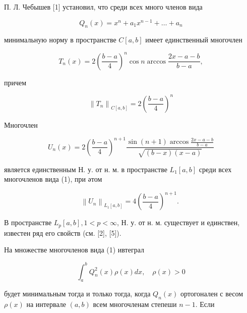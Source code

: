 \documentclass[10pt]{article}
\begin{document}
П. Л. Чебышев [1] установил, что среди всех много членов вида



\[

Q_{n}(x)=x^{n}+a_{1} x^{n-1}+\ldots+a_{n}

\]



минимальную норму в пространстве $C[a, b]$ имеет единственный многочлен



\[

T_{n}(x)=2\left(\frac{b-a}{4}\right)^{n} \cos n \arccos \frac{2 x-a-b}{b-a},

\]



причем



\[

\left\|T_{n}\right\|_{C[a, b]}=2\left(\frac{b-a}{4}\right)^{n}

\]



Многочлен



\[

U_{n}(x)=2\left(\frac{b-a}{4}\right)^{n+1} \frac{\sin (n+1) \arccos \frac{2 x-a-b}{b-a}}{\sqrt{(b-x)(x-a)}}

\]



является единственным Н. у. от н. м. в пространстве $L_{1}[a, b]$ среди всех многочленов вида (1), при әтом



\[

\left\|U_{n}\right\|_{L_{1}[a, b]}=4\left(\frac{b-a}{4}\right)^{n+1} \text {. }

\]



В пространстве $L_{p}[a, b], 1<p<\infty$, Н. у. от н. м. существует и единствен, известен ряд его свойств (см. [2], [5]).



На множестве многочленов вида (1) ивтеграл



\[

\int_{a}^{b} Q_{n}^{2}(x) \rho(x) d x, \quad \rho(x)>0

\]



будет минимальным тогда и только тогда, когда $Q_{n}(x)$ ортогонален с весом $\rho(x)$ на интервале $(a, b)$ всем многочленам степеши $n-1$. Если
\end{document}
